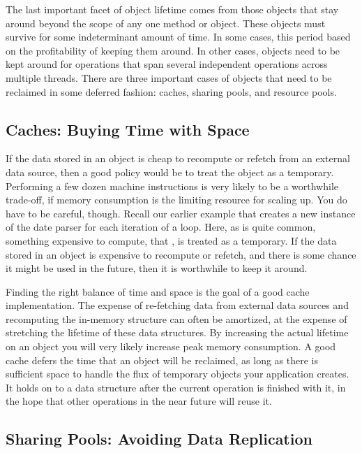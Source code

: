 The last important facet of object lifetime comes from those objects that stay
around beyond the scope of any one method or object. These objects must survive
for some indeterminant amount of time. In some cases, this period based on the
profitability of keeping them around. In other cases, objects need to be kept
around for operations that span several independent operations across multiple
threads.
There are three important cases of objects that need to be reclaimed in some
deferred fashion: caches, sharing pools, and resource pools.

\subsection{Caches: Buying Time with Space}
\label{sec:caches}

If the data stored in an object is cheap to recompute or refetch from an
external data source, then a good policy would be to treat the object as a
temporary. Performing a few dozen machine instructions is very likely to be a
worthwhile trade-off, if memory consumption is the limiting resource for
scaling up. 
You do have to be careful, though. Recall our earlier example that creates a new
instance of the date parser  for each iteration of a
loop. Here, as is quite common, something expensive to compute, that
, is treated as a temporary. If the data stored in an
object is expensive to recompute or refetch, and there is some chance it might
be used in the future, then it is worthwhile to keep it around.

Finding the right balance of time and space is the goal of a good cache
implementation. The expense of re-fetching data from external data sources and
recomputing the in-memory structure can often be amortized, at the expense of
stretching the lifetime of these data structures. By increasing the actual
lifetime on an object you will very likely increase peak memory consumption. A
good cache defers the time that an object will be reclaimed, as long as there is
sufficient space to handle the flux of temporary objects your application
creates. It holds on to a data structure after the current operation is finished
with it, in the hope that other operations in the near future will reuse it.

\subsection{Sharing Pools: Avoiding Data Replication}
\label{sec:sharing-pools}

